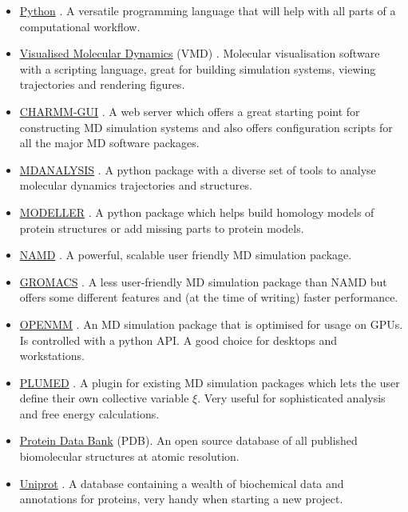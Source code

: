 \begin{itemize}
	\item \href{https://www.python.org/about/gettingstarted/}{Python} \cite{van1995python}. A versatile programming language that will help with all parts of a computational workflow.
	\item \href{https://www.ks.uiuc.edu/Research/vmd/}{Visualised Molecular Dynamics} (VMD) \cite{humphrey1996}. Molecular visualisation software with a scripting language, great for building simulation systems, viewing trajectories and rendering figures. 
	\item \href{https://charmm-gui.org}{CHARMM-GUI} \cite{mallajosyula2015}. A web server which offers a great starting point for constructing MD simulation systems and also offers configuration scripts for all the major MD software packages.
	\item \href{https://www.mdanalysis.org/}{MDANALYSIS} \cite{michaud-agrawal2011, gowers2016}. A python package with a diverse set of tools to analyse molecular dynamics trajectories and structures. 
	\item \href{https://salilab.org/modeller/}{MODELLER} \cite{sali1993, shen2006, webb2016}. A python package which helps build homology models of protein structures or add missing parts to protein models.
	\item \href{https://www.ks.uiuc.edu/Research/namd/}{NAMD} \cite{phillips2005}. A powerful, scalable user friendly MD simulation package.
	\item \href{https://manual.gromacs.org/current/index.html}{GROMACS} \cite{abraham2015}. A less user-friendly MD simulation package than NAMD but offers some different features and (at the time of writing) faster performance.
	\item \href{https://openmm.org/}{OPENMM} \cite{eastman2017}. An MD simulation package that is optimised for usage on GPUs. Is controlled with a python API. A good choice for desktops and workstations.
	\item \href{https://www.plumed.org/}{PLUMED} \cite{tribello2014}. A plugin for existing MD simulation packages which lets the user define their own collective variable $\xi$. Very useful for sophisticated analysis and free energy calculations. 
	\item \href{https://www.rcsb.org/}{Protein Data Bank} (PDB). An open source database of all published biomolecular structures at atomic resolution. 
	\item \href{https://www.uniprot.org/}{Uniprot} \cite{theuniprotconsortium2021}. A database containing a wealth of biochemical data and annotations for proteins, very handy when starting a new project.

\end{itemize}
